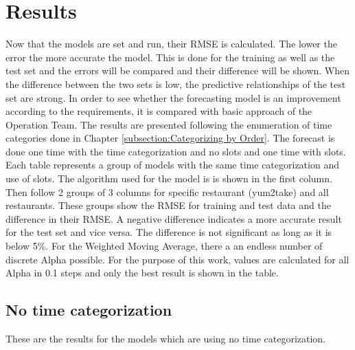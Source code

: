 \chapter{Results}\label{chapter:Results}
Now that the models are set and run, their RMSE is calculated. The lower the error the more accurate the model. This is done for the training as well as the test set and the errors will be compared and their difference will be shown. When the difference between the two sets is low, the predictive relationships of the test set are strong.\newline
In order to see whether the forecasting model is an improvement according to the requirements, it is compared with basic approach of the Operation Team.\newline
The results are presented following the enumeration of time categories done in Chapter \ref{subsection:Categorizing by Order}. The forecast is done one time with the time categorization and no slots and one time with slots.\newline
Each table represents a group of models with the same time categorization and use of slots. The algorithm used for the model is is shown in the first column. Then follow 2 groups of 3 columns for specific restaurant (yum2take) and all restaurants. These groups show the RMSE for training and test data and the difference in their RMSE. A negative difference indicates a more accurate result for the test set and vice versa. The difference is not significant as long as it is below 5\%.\newline
For the Weighted Moving Average, there a an endless number of discrete Alpha possible. For the purpose of this work, values are calculated for all Alpha in 0.1 steps and only the best result is shown in the table.
\section{No time categorization}\label{section:No time categorization}
These are the results for the models which are using no time categorization.
